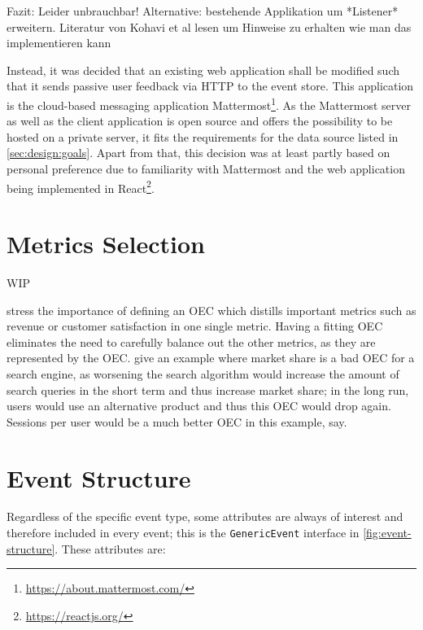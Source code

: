 Fazit: Leider unbrauchbar!
Alternative: bestehende Applikation um *Listener* erweitern. Literatur von Kohavi et al lesen um Hinweise zu erhalten wie man das implementieren kann

Instead, it was decided that an existing web application shall be modified such that it sends passive user feedback via \ac{HTTP} to the event store.
This application is the cloud-based messaging application Mattermost\footnote{\url{https://about.mattermost.com/}}.
As the Mattermost server as well as the client application is open source and offers the possibility to be hosted on a private server, it fits the requirements for the data source listed in \cref{sec:design:goals}.
Apart from that, this decision was at least partly based on personal preference due to familiarity with Mattermost and the web application being implemented in React\footnote{\url{https://reactjs.org/}}.

\section{Metrics Selection}
\label{sec:design:metrics}

WIP
\cite{Kelly:2003:IFI:959258.959260}
\cite{Claypool2001}


\citet{Kohavi2013a} stress the importance of defining an \ac{OEC} which distills important metrics such as revenue or customer satisfaction in one single metric.
Having a fitting \ac{OEC} eliminates the need to carefully balance out the other metrics, as they are represented by the \ac{OEC}.
\citeauthor{Kohavi2013a} give an example where market share is a bad \ac{OEC} for a search engine, as worsening the search algorithm would increase the amount of search queries in the short term and thus increase market share; in the long run, users would use an alternative product and thus this \ac{OEC} would drop again.
Sessions per user would be a much better \ac{OEC} in this example, \citeauthor{Kohavi2013a} say.

\section{Event Structure}
\label{sec:design:event-structure}

Regardless of the specific event type, some attributes are always of interest and therefore included in every event; this is the \texttt{GenericEvent} interface in \cref{fig:event-structure}.
These attributes are:

